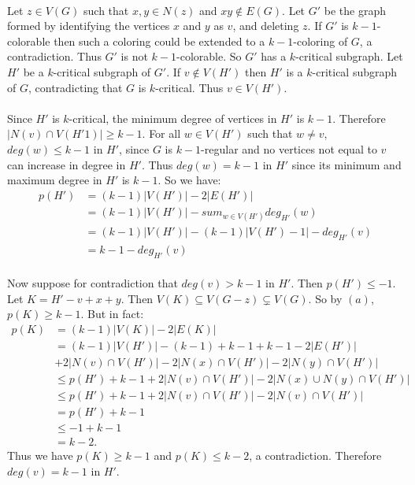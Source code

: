 \documentclass[letterpaper,12pt,oneside,onecolumn]{report}
\begin{document}
\paragraph{}
Let $z \in V(G)$ such that $x,y \in N(z)$ and $xy \not\in E(G)$. Let $G'$ be the graph formed by identifying the vertices $x$ and $y$ as $v$, and deleting $z$. If $G'$ is $k-1$-colorable then such a coloring could be extended to a $k-1$-coloring of $G$, a contradiction. Thus $G'$ is not $k-1$-colorable. So $G'$ has a $k$-critical subgraph. Let $H'$ be a $k$-critical subgraph of $G'$. If $v \not\in V(H')$ then $H'$ is a $k$-critical subgraph of $G$, contradicting that $G$ is $k$-critical. Thus $v \in V(H')$.
\paragraph{}
Since $H'$ is $k$-critical, the minimum degree of vertices in $H'$ is $k-1$. Therefore $|N(v) \cap V(H'1)| \geq k-1$. For all $w\in V(H')$ such that $w \neq v$, $deg(w) \leq k-1$ in $H'$, since $G$ is $k-1$-regular and no vertices not equal to $v$ can increase in degree in $H'$. Thus $deg(w) = k-1$ in $H'$ since its minimum and maximum degree in $H'$ is $k-1$.  So we have:
\begin{align*}
p(H') &= (k-1)|V(H')| - 2|E(H')| \\
&= (k-1)|V(H')| - sum_{w \in V(H')} deg_{H'}(w)\\
&= (k-1)|V(H')| - (k-1)|V(H') - 1| - deg_{H'}(v)\\
&= k-1 - deg_{H'}(v) 
\end{align*}
\paragraph{}
Now suppose for contradiction that $deg(v) > k-1$ in $H'$. Then $p(H') \leq -1$. Let $K = H' - v + x + y$. Then $V(K) \subseteq V(G-z) \subsetneq V(G)$. So by $(a)$, $p(K) \geq k-1$. But in fact:
\begin{align*}
p(K) &= (k-1)|V(K)| - 2|E(K)| \\
&= (k-1)|V(H')| -(k-1) + k-1 + k-1 -2|E(H')|\\
&+ 2|N(v) \cap V(H')| - 2|N(x) \cap V(H')| - 2|N(y) \cap V(H')| \\
&\leq p(H') + k-1 + 2|N(v) \cap V(H')| - 2|N(x) \cup N(y) \cap V(H')|\\
&\leq p(H') + k-1 + 2|N(v) \cap V(H')| - 2|N(v) \cap V(H')|\\
&= p(H') + k-1\\
&\leq -1 + k - 1\\
&= k-2. 
\end{align*}
Thus we have $p(K) \geq k-1$ and $p(K) \leq k-2$, a contradiction. Therefore $deg(v) = k-1$ in $H'$.
\end{document}
